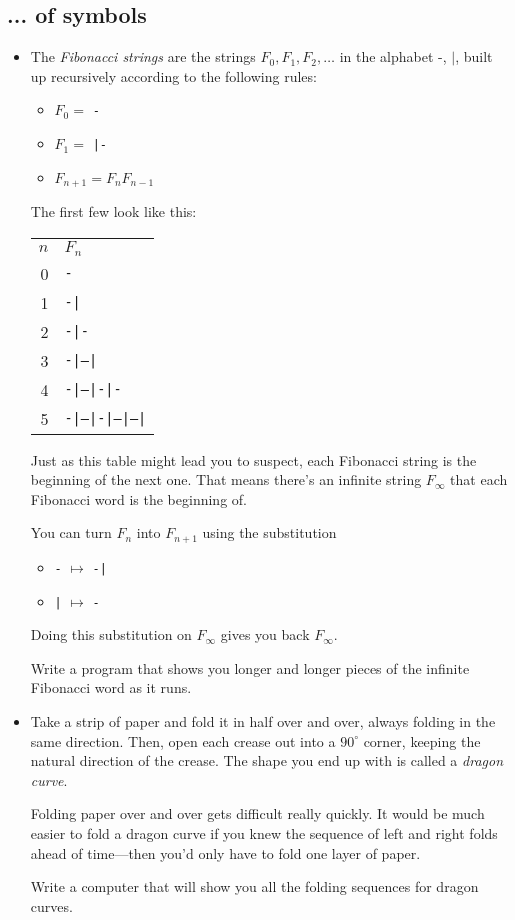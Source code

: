 \documentclass{article}
\newcommand*{\writeit}{\item[\NibRight]}
\newcommand{\str}[1]{\texttt{#1}}
\begin{document}
\subsection*{... of symbols}
\begin{itemize}
\writeit
The {\em Fibonacci strings} are the strings $F_0, F_1, F_2, \ldots$ in the alphabet $\str{-}$, $\str{|}$, built up recursively according to the following rules:
\begin{itemize}
\item[] $F_0 =$ \str{-}
\item[] $F_1 =$ \str{|-}
\item[] $F_{n + 1} = F_n F_{n - 1}$
\end{itemize}
The first few look like this:
\begin{center}
\begin{tabular}{rl}
$n$ & $F_n$ \\
0 & \str{-} \\
1 & \str{-|} \\
2 & \str{-|-} \\
3 & \str{-|--|} \\
4 & \str{-|--|-|-} \\
5 & \str{-|--|-|--|--|}
\end{tabular}
\end{center}
Just as this table might lead you to suspect, each Fibonacci string is the beginning of the next one. That means there's an infinite string $F_\infty$ that each Fibonacci word is the beginning of.

You can turn $F_n$ into $F_{n + 1}$ using the substitution
\begin{itemize}
\item[] \str{-} $\mapsto$ \str{-|}
\item[] \str{|} $\mapsto$ \str{-}
\end{itemize}
Doing this substitution on $F_\infty$ gives you back $F_\infty$.

Write a program that shows you longer and longer pieces of the infinite Fibonacci word as it runs.
\writeit
Take a strip of paper and fold it in half over and over, always folding in the same direction. Then, open each crease out into a $90^\circ$ corner, keeping the natural direction of the crease. The shape you end up with is called a {\em dragon curve}.

Folding paper over and over gets difficult really quickly. It would be much easier to fold a dragon curve if you knew the sequence of left and right folds ahead of time---then you'd only have to fold one layer of paper.

Write a computer that will show you all the folding sequences for dragon curves.
\end{itemize}
\end{document}
